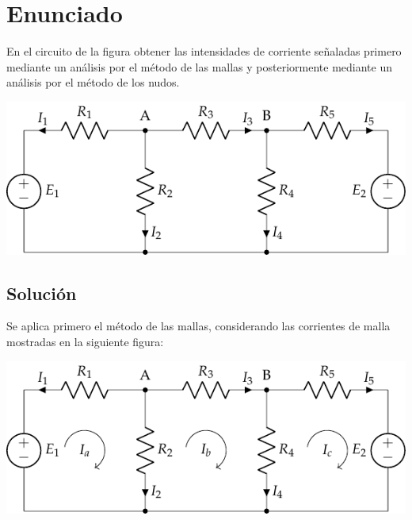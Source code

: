 \section{Enunciado}
En el circuito de la figura obtener las intensidades de corriente
señaladas primero mediante un análisis por el método de las mallas y
posteriormente mediante un análisis por el método de los nudos.

\begin{center}
  \includegraphics{figuras/BT1_08.pdf}
\end{center}

\subsection*{Solución}
Se aplica primero el método de las mallas, considerando las corrientes
de malla mostradas en la siguiente figura:
\begin{center}
  \includegraphics{figuras/BT1_08_mallas.pdf}
\end{center}

